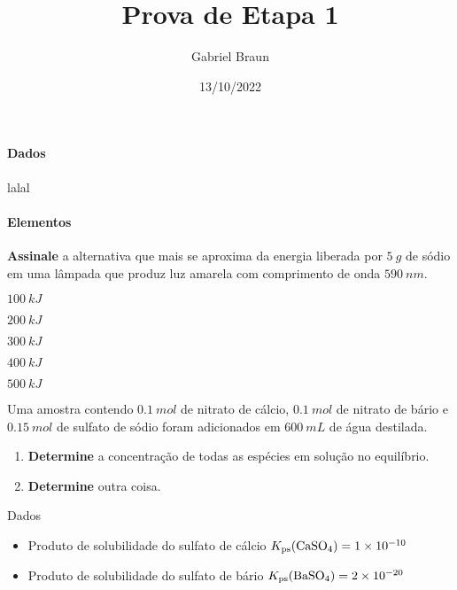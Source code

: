 \documentclass[prova]{braun}
\title{Prova de Etapa 1}
\author{Gabriel Braun}
\date{13/10/2022}
\begin{document}
\maketitle

\paragraph{Dados}

lalal

\paragraph{Elementos}
\begin{center}
\end{center}

\hspace{2em}

\begin{problem}[
	points={10}
]
\textbf{Assinale} a alternativa que mais se aproxima da energia liberada
por {\(\qty{5}{g}\)} de sódio em uma lâmpada que produz luz amarela com
comprimento de onda {\(\qty{590}{nm}\)}.

\begin{choices}
\item {\(\qty{100}{kJ}\)}

\item {\(\qty{200}{kJ}\)}

\item {\(\qty{300}{kJ}\)}

\item {\(\qty{400}{kJ}\)}

\item {\(\qty{500}{kJ}\)}

\end{choices}

\end{problem}

\newpage

\begin{problem}[
	points={10}
]
Uma amostra contendo {\(\qty{0,1}{mol}\)} de nitrato de cálcio,
{\(\qty{0,1}{mol}\)} de nitrato de bário e {\(\qty{0,15}{mol}\)} de
sulfato de sódio foram adicionados em {\(\qty{600}{mL}\)} de água
destilada.

\begin{enumerate}
\def\labelenumi{\alph{enumi}.}
\tightlist
\item
  \textbf{Determine} a concentração de todas as espécies em solução no
  equilíbrio.
\item
  \textbf{Determine} outra coisa.
\end{enumerate}

Dados

\begin{itemize}
\tightlist
\item
  Produto de solubilidade do sulfato de cálcio
  {\(K_\mathrm{ps}(\ce{CaSO4}) = \num{1e-10}\)}
\item
  Produto de solubilidade do sulfato de bário
  {\(K_\mathrm{ps}(\ce{BaSO4}) = \num{2e-20}\)}
\end{itemize}

\end{problem}
\end{document}
